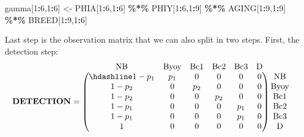 \documentclass[
  12pt,
]{krantz}
\newenvironment{Shaded}{\begin{snugshade}}{\end{snugshade}}
\newcommand{\DecValTok}[1]{\textcolor[rgb]{0.00,0.00,0.81}{#1}}
\newcommand{\NormalTok}[1]{#1}
\newcommand{\OtherTok}[1]{\textcolor[rgb]{0.56,0.35,0.01}{#1}}
\newcommand{\SpecialCharTok}[1]{\textcolor[rgb]{0.81,0.36,0.00}{\textbf{#1}}}
\begin{document}
\begin{Shaded}
\begin{Highlighting}[]
\NormalTok{gamma[}\DecValTok{1}\SpecialCharTok{:}\DecValTok{6}\NormalTok{,}\DecValTok{1}\SpecialCharTok{:}\DecValTok{6}\NormalTok{] }\OtherTok{\textless{}{-}}\NormalTok{ PHIA[}\DecValTok{1}\SpecialCharTok{:}\DecValTok{6}\NormalTok{,}\DecValTok{1}\SpecialCharTok{:}\DecValTok{6}\NormalTok{] }\SpecialCharTok{\%*\%}\NormalTok{ PHIY[}\DecValTok{1}\SpecialCharTok{:}\DecValTok{6}\NormalTok{,}\DecValTok{1}\SpecialCharTok{:}\DecValTok{9}\NormalTok{] }\SpecialCharTok{\%*\%}\NormalTok{ AGING[}\DecValTok{1}\SpecialCharTok{:}\DecValTok{9}\NormalTok{,}\DecValTok{1}\SpecialCharTok{:}\DecValTok{9}\NormalTok{] }\SpecialCharTok{\%*\%}\NormalTok{ BREED[}\DecValTok{1}\SpecialCharTok{:}\DecValTok{9}\NormalTok{,}\DecValTok{1}\SpecialCharTok{:}\DecValTok{6}\NormalTok{]}
\end{Highlighting}
\end{Shaded}

Last step is the observation matrix that we can also split in two steps. First, the detection step:
\[
\begin{matrix}
& \\
\mathbf{DETECTION} =
\left ( \vphantom{ \begin{matrix} 12 \\ 12 \\ 12 \\ 12 \\ 12 \\ 12 \end{matrix} } \right .
\end{matrix}
\hspace{-1.2em}
\begin{matrix}
\text{NB} & \text{Byoy} & \text{Bc1} & \text{Bc2} & \text{Bc3} & \text{D} \\ \hdashline
1 - p_1 & p_1 & 0 & 0 & 0 & 0 \\
1 - p_2 & 0 & p_2 & 0 & 0 & 0 \\
1 - p_2 & 0 & 0 & p_2 & 0 & 0 \\
1 - p_1 & 0 & 0 & 0 & p_1 & 0 \\
1 - p_1 & 0 & 0 & 0 & p_1 & 0 \\
1 & 0 & 0 & 0 & 0 & 0
\end{matrix}
\hspace{-0.2em}
\begin{matrix}
& \\
\left . \vphantom{ \begin{matrix} 12 \\ 12 \\ 12 \\ 12 \\ 12 \\ 12 \end{matrix} } \right )
\begin{matrix}
\text{NB} \\
\text{Byoy} \\
\text{Bc1} \\
\text{Bc2} \\
\text{Bc3} \\
\text{D}
\end{matrix}
\end{matrix}
\]
\end{document}
